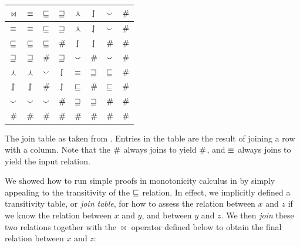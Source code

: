 %
%


\begin{table}[t]
	\begin{center}
	\begin{tabular}{|c||c|c|c|c|c|c|c|}
    \hline
    $\bowtie$ & $\equiv$ & $\sqsubseteq$ & $\sqsupseteq$ & $\curlywedge$ & $\downharpoonleft\hspace{-1.25mm}\upharpoonright$ & $\smallsmile$ & $\#$ \\
    \hline
    $\equiv$ & $\equiv$ & $\sqsubseteq$ & $\sqsupseteq$ & $\curlywedge$ & $\downharpoonleft\hspace{-1.25mm}\upharpoonright$ & $\smallsmile$ & $\#$ \\
    $\sqsubseteq$ & $\sqsubseteq$ & $\sqsubseteq$ & $\#$ & $\downharpoonleft\hspace{-1.25mm}\upharpoonright$ & $\downharpoonleft\hspace{-1.25mm}\upharpoonright$ & $\#$ & $\#$ \\
    $\sqsupseteq$ & $\sqsupseteq$ & $\#$ & $\sqsupseteq$ & $\smallsmile$ & $\#$ & $\smallsmile$ & $\#$  \\
    $\curlywedge$ & $\curlywedge$ & $\smallsmile$ & $\downharpoonleft\hspace{-1.25mm}\upharpoonright$ & $\equiv$ & $\sqsupseteq$ & $\sqsubseteq$ & $\#$  \\
    $\downharpoonleft\hspace{-1.25mm}\upharpoonright$ & $\downharpoonleft\hspace{-1.25mm}\upharpoonright$ & $\#$ & $\downharpoonleft\hspace{-1.25mm}\upharpoonright$ & $\sqsubseteq$ & $\#$ & $\sqsubseteq$ & $\#$  \\
    $\smallsmile$ & $\smallsmile$ & $\smallsmile$ & $\#$ & $\sqsupseteq$ & $\sqsupseteq$ & $\#$ & $\#$  \\
    $\#$ & $\#$ & $\#$ & $\#$ & $\#$ & $\#$ & $\#$ & $\#$ \\
    \hline
	\end{tabular}
  {
    The join table as taken from .
    Entries in the table are the result of joining a row with a
      column.
    Note that the $\#$ always joins to yield $\#$,
    and $\equiv$ always joins to yield the input relation.
		\label{tab:natlog-jointable}
	}
	\end{center}
\end{table}



We showed how to run simple proofs in monotonicity calculus in 
   by simply appealing to the transitivity of the
  $\sqsubseteq$ relation.
In effect, we implicitly defined a transitivity table, or \textit{join table},
  for how to assess the relation between $x$ and $z$ if we know the relation
  between $x$ and $y$, and between $y$ and $z$.
We then \textit{join} these two relations together with the $\bowtie$ operator defined
  below to obtain the final relation between $x$ and $z$:
	
